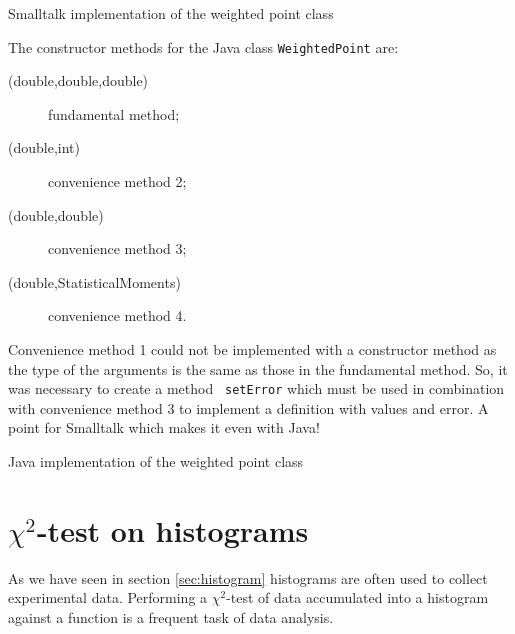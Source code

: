 \documentclass[twoside]{book}
\begin{document}
\begin{listing} Smalltalk implementation of the weighted point class
\label{ls:weightedPoint}


\end{listing}

The constructor methods for the Java class {\tt WeightedPoint}
are:
\begin{description}
  \item[(double,double,double)] fundamental method;
  \item[(double,int)] convenience method 2;
  \item[(double,double)] convenience method 3;
  \item[(double,StatisticalMoments)] convenience method 4.
\end{description}
Convenience method 1 could not be implemented with a constructor
method as the type of the arguments is the same as those in the
fundamental method. So, it was necessary to create a method {\tt
setError} which must be used in combination with convenience
method 3 to implement a definition with values and error. A point
for Smalltalk which makes it even with Java!

\begin{listing} Java implementation of the weighted point class
\label{lj:weightedPoint}

\end{listing}

\section{$\chi^2$-test on histograms}
\label{sec:chitesthist} As we have seen in section
\ref{sec:histogram} histograms are often used to collect
experimental data. Performing a $\chi^2$-test of data accumulated
into a histogram against a function is a frequent task of data
analysis.
\end{document}
